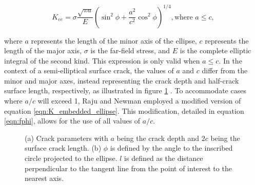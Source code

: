 \begin{equation} \label{eqn:K_embedded_ellipse}
    K_{ee} = \sigma \frac{\sqrt{\pi a}}{E} \left( \sin^2 \phi + \frac{a^2}{c^2} \cos^2 \phi \right)^{1/4}, \text{where } a \le c, 
\end{equation}

where $a$ represents the length of the minor axis of the ellipse, $c$ represents the length of the major axis, $\sigma$ is the far-field stress, and $E$ is the complete elliptic integral of the second kind. This expression is only valid when $a \leq c$. In the context of a semi-elliptical surface crack, the values of $a$ and $c$ differ from the minor and major axes, instead representing the crack depth and half-crack surface length, respectively, as illustrated in figure \ref{fig:crack_params} \cite{tada1985}. To accommodate cases where $a/c$ will exceed 1, Raju and Newman employed a modified version of equation \ref{eqn:K_embedded_ellipse}. This modification, detailed in equation \ref{eqn:fphi}, allows for the use of all values of $a/c$.
\begin{figure}%
    \centering
    \qquad
    \caption{(a) Crack parameters with $a$ being the crack depth and $2c$ being the surface crack length. (b) $\phi$ is defined by the angle to the inscribed circle projected to the ellipse. $l$ is defined as the distance perpendicular to the tangent line from the point of interest to the nearest axis.}%
    \label{fig:crack_params}%
\end{figure}
